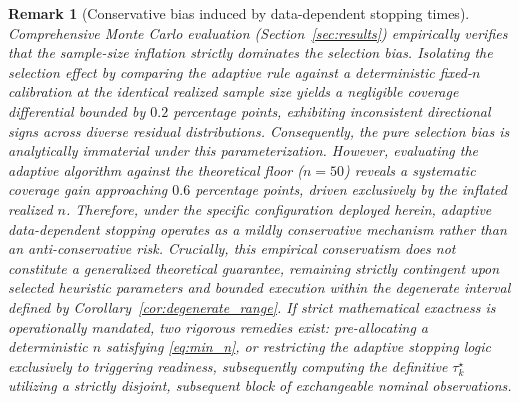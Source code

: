 \documentclass[a4paper]{cas-sc}
\newtheorem{remark}{Remark}
\begin{document}
\begin{remark}[Conservative bias induced by data-dependent stopping times]
Comprehensive Monte Carlo evaluation (Section~\ref{sec:results}) empirically verifies that the sample-size inflation strictly dominates the selection bias. Isolating the selection effect by comparing the adaptive rule against a deterministic fixed-\(n\) calibration at the \emph{identical} realized sample size yields a negligible coverage differential bounded by \(0.2\) percentage points, exhibiting inconsistent directional signs across diverse residual distributions. Consequently, the pure selection bias is analytically immaterial under this parameterization. However, evaluating the adaptive algorithm against the theoretical floor (\(n=50\)) reveals a systematic coverage \emph{gain} approaching \(0.6\) percentage points, driven exclusively by the inflated realized \(n\). Therefore, under the specific configuration deployed herein, adaptive data-dependent stopping operates as a mildly conservative mechanism rather than an anti-conservative risk. Crucially, this empirical conservatism does not constitute a generalized theoretical guarantee, remaining strictly contingent upon selected heuristic parameters and bounded execution within the degenerate interval defined by Corollary~\ref{cor:degenerate_range}. If strict mathematical exactness is operationally mandated, two rigorous remedies exist: pre-allocating a deterministic \(n\) satisfying \eqref{eq:min_n}, or restricting the adaptive stopping logic exclusively to triggering readiness, subsequently computing the definitive \(\tau_k^\star\) utilizing a strictly disjoint, subsequent block of exchangeable nominal observations.
\end{remark}
\end{document}
